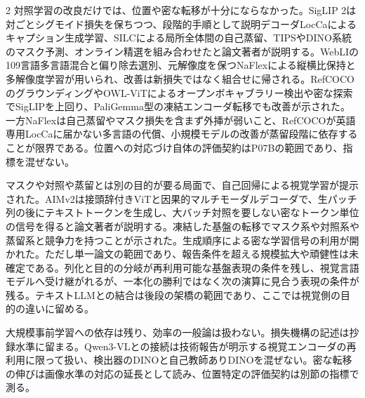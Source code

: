 \documentclass[lualatex,a4paper,10pt]{jlreq}
\begin{document}
\begin{multicols}{2}
\noindent 対照学習の改良だけでは、位置や密な転移が十分にならなかった。SigLIP 2は対ごとシグモイド損失を保ちつつ、段階的手順として説明デコーダLocCaによるキャプション生成学習、SILCによる局所全体間の自己蒸留、TIPSやDINO系統のマスク予測、オンライン精選を組み合わせたと論文著者が説明する。WebLIの109言語多言語混合と偏り除去選別、元解像度を保つNaFlexによる縦横比保持と多解像度学習が用いられ、改善は新損失ではなく組合せに帰される。RefCOCOのグラウンディングやOWL-ViTによるオープンボキャブラリー検出や密な探索でSigLIPを上回り、PaliGemma型の凍結エンコーダ転移でも改善が示された。一方NaFlexは自己蒸留やマスク損失を含まず外挿が弱いこと、RefCOCOが英語専用LocCaに届かない多言語の代償、小規模モデルの改善が蒸留段階に依存することが限界である。位置への対応づけ自体の評価契約はP07Bの範囲であり、指標を混ぜない。\autocite{vmd114}\par\medskip
\noindent マスクや対照や蒸留とは別の目的が要る局面で、自己回帰による視覚学習が提示された。AIMv2は接頭辞付きViTと因果的マルチモーダルデコーダで、生パッチ列の後にテキストトークンを生成し、大バッチ対照を要しない密なトークン単位の信号を得ると論文著者が説明する。凍結した基盤の転移でマスク系や対照系や蒸留系と競争力を持つことが示された。生成順序による密な学習信号の利用が開かれた。ただし単一論文の範囲であり、報告条件を超える規模拡大や頑健性は未確定である。列化と目的の分岐が再利用可能な基盤表現の条件を残し、視覚言語モデルへ受け継がれるが、一本化の勝利ではなく次の演算に見合う表現の条件が残る。テキストLLMとの結合は後段の架橋の範囲であり、ここでは視覚側の目的の違いに留める。\autocite{vmd118}\par\medskip
\end{multicols}
\begin{claimboundary}[本節の読解上の境界]
\noindent 大規模事前学習への依存は残り、効率の一般論は扱わない。損失機構の記述は抄録水準に留まる。Qwen3-VLとの接続は技術報告が明示する視覚エンコーダの再利用に限って扱い、検出器のDINOと自己教師ありDINOを混ぜない。密な転移の伸びは画像水準の対応の延長として読み、位置特定の評価契約は別節の指標で測る。\autocite{vmd030,vmd033,vmd034,vmd035,vmd036,vmd113,vmd114,vmd031,vmd032,vmd118}\par
\end{claimboundary}

\Needspace{0.20\textheight}
\end{document}
